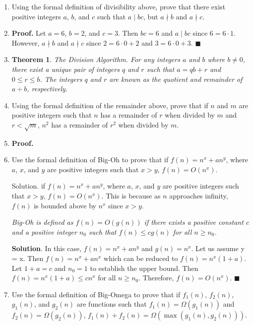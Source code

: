 \documentclass[12pt, letterpaper]{article}
\begin{document}
\begin{enumerate}
    \item Using the formal definition of divisibility above, prove that there exist positive integers $a$, $b$, and $c$ such that $a \mid bc$, but $a \nmid b$ and $a \nmid c$.

    \item[] \textbf{Proof.} Let $a = 6$, $b = 2$, and $c = 3$. Then $bc = 6$ and $a \mid bc$ since $6 = 6 \cdot 1$. However, $a \nmid b$ and $a \nmid c$ since $2 = 6 \cdot 0 + 2$ and $3 = 6 \cdot 0 + 3$. $\blacksquare$

    \item[] \textbf{Theorem 1}. \textit{The Division Algorithm. For any integers $a$ and $b$ where $b \neq 0$, there exist a unique pair of integers $q$ and $r$ such that $a = qb + r$ and $0 \leq r \leq b$.  The integers $q$ and $r$ are known as the quotient and remainder of $a \div b$, respectively.}

    \item Using the formal definition of the remainder above, prove that if $n$ and $m$ are positive integers such that $n$ has a remainder of $r$ when divided by $m$ and $r < \sqrt{m}$, $n^2$ has a remainder of $r^2$ when divided by $m$.

    \item[] \textbf{Proof.}
        
    \item Use the formal definition of Big-Oh to prove that if $f(n) = n^x + an^y$, where $a$, $x$, and $y$ are positive integers such that $x > y$, $f(n) = O(n^x)$.

    Solution.  if $f(n) = n^x + an^y$, where $a$, $x$, and $y$ are positive integers such that $x > y$, $f(n) = O(n^x)$. This is because as $n$ approaches infinity, $f(n)$ is bounded above by $n^x$ since $x > y$. 
        
    \textit{Big-Oh is defined as $f(n) = O(g(n))$ if there exists a positive constant $c$ and a positive integer $n_0$ such that $f(n) \leq cg(n)$ for all $n \geq n_0$.}

    \textbf{Solution}. In this case, $f(n) = n^x + an^y$ and $g(n) = n^x$. Let us assume y = x. Then $f(n) = n^x + an^x$ which can be reduced to $f(n) = n^x(1 + a)$.  Let $1+a = c$ and $n_0 = 1$ to establish the upper bound. Then $f(n) = n^x(1 + a) \leq cn^x$ for all $n \geq n_0$. Therefore, $f(n) = O(n^x)$. $\blacksquare$

    \item Use the formal definition of Big-Omega to prove that if $f_1(n)$, $f_2(n)$, $g_1(n)$, and $g_2(n)$ are functions such that $f_1(n) = \Omega(g_1(n))$ and $f_2(n) = \Omega(g_2(n))$, $f_1(n) + f_2(n) = \Omega(\max(g_1(n), g_2(n)))$.
\end{enumerate}
\end{document}
